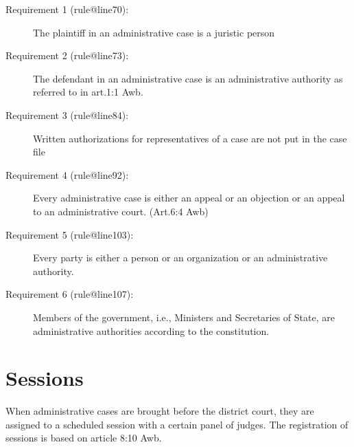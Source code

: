 \documentclass[10pt,a4paper]{report}              %
\theoremstyle{plain}\theorembodyfont{\rmfamily}\newtheorem{definition}{Definition}[section]
\theoremstyle{plain}\theorembodyfont{\rmfamily}\newtheorem{designrule}[definition]{Requirement}
\begin{document}
\begin{description}
\item[Requirement 1 (rule@line70):]
\label{ReqRule:rule@line70}
The plaintiff in an administrative case is a juristic person

\end{description}
\begin{description}
\item[Requirement 2 (rule@line73):]
\label{ReqRule:rule@line73}
The defendant in an administrative case is an administrative authority
as referred to in art.1:1 Awb.

\end{description}
\begin{description}
\item[Requirement 3 (rule@line84):]
\label{ReqRule:rule@line84}
Written authorizations for representatives of a case are not put in the
case file

\end{description}
\begin{description}
\item[Requirement 4 (rule@line92):]
\label{ReqRule:rule@line92}
Every administrative case is either an appeal or an objection or an
appeal to an administrative court. (Art.6:4 Awb)

\end{description}
\begin{description}
\item[Requirement 5 (rule@line103):]
\label{ReqRule:rule@line103}
Every party is either a person or an organization or an administrative
authority.

\end{description}
\begin{description}
\item[Requirement 6 (rule@line107):]
\label{ReqRule:rule@line107}
Members of the government, i.e., Ministers and Secretaries of State, are
administrative authorities according to the constitution.

\end{description}
\section{Sessions}

When administrative cases are brought before the district court, they
are assigned to a scheduled session with a certain panel of judges. The
registration of sessions is based on article 8:10 Awb.
\end{document}
